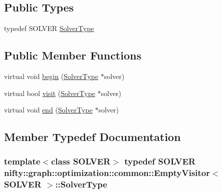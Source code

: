 \subsection*{Public Types}
\begin{DoxyCompactItemize}
\item 
typedef S\+O\+L\+V\+E\+R \hyperlink{classnifty_1_1graph_1_1optimization_1_1common_1_1EmptyVisitor_adc8b10f2bbb4a7ec75744676ce6ed05d}{Solver\+Type}
\end{DoxyCompactItemize}
\subsection*{Public Member Functions}
\begin{DoxyCompactItemize}
\item 
virtual void \hyperlink{classnifty_1_1graph_1_1optimization_1_1common_1_1EmptyVisitor_a5d0f0781404463df31cc24c7f08396fb}{begin} (\hyperlink{classnifty_1_1graph_1_1optimization_1_1common_1_1VisitorBase_a233e657d5334c972e39a44ac675f6e85}{Solver\+Type} $\ast$solver)
\item 
virtual bool \hyperlink{classnifty_1_1graph_1_1optimization_1_1common_1_1EmptyVisitor_a31ec5e330004b35450496495f94075cd}{visit} (\hyperlink{classnifty_1_1graph_1_1optimization_1_1common_1_1VisitorBase_a233e657d5334c972e39a44ac675f6e85}{Solver\+Type} $\ast$solver)
\item 
virtual void \hyperlink{classnifty_1_1graph_1_1optimization_1_1common_1_1EmptyVisitor_abb1ba16f53683fcc1a60c4bf94fbcfc2}{end} (\hyperlink{classnifty_1_1graph_1_1optimization_1_1common_1_1VisitorBase_a233e657d5334c972e39a44ac675f6e85}{Solver\+Type} $\ast$solver)
\end{DoxyCompactItemize}


\subsection{Member Typedef Documentation}
\hypertarget{classnifty_1_1graph_1_1optimization_1_1common_1_1EmptyVisitor_adc8b10f2bbb4a7ec75744676ce6ed05d}{}
\subsubsection[{Solver\+Type}]{\setlength{\rightskip}{0pt plus 5cm}template$<$class S\+O\+L\+V\+E\+R$>$ typedef S\+O\+L\+V\+E\+R {\bf nifty\+::graph\+::optimization\+::common\+::\+Empty\+Visitor}$<$ S\+O\+L\+V\+E\+R $>$\+::{\bf Solver\+Type}}\label{classnifty_1_1graph_1_1optimization_1_1common_1_1EmptyVisitor_adc8b10f2bbb4a7ec75744676ce6ed05d}


